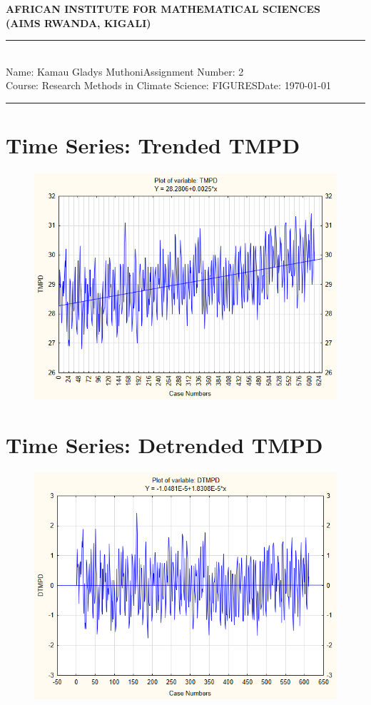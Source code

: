 \documentclass[12pt,a4paper]{article}
\newcommand{\student}{Kamau Gladys Muthoni}
\newcommand{\course}{Research Methods in Climate Science: FIGURES}
\newcommand{\assignment}{2}
\begin{document}
\thispagestyle{empty}
\begin{center}
\textbf{AFRICAN INSTITUTE FOR MATHEMATICAL SCIENCES \\[0.5cm]
(AIMS RWANDA, KIGALI)}
\vspace{1.0cm}
\end{center}

\noindent
\rule{17cm}{0.2cm}\\[0.3cm]
Name: \student \hfill Assignment Number: \assignment\\[0.1cm]
Course: \course \hfill Date: \today\\
\rule{17cm}{0.05cm}
\vspace{1.0cm}

\section{Time Series: Trended TMPD}


\begin{figure}[h]
	\centering
	\includegraphics[width=0.7\linewidth]{"Trended TMPD"}
	\caption{}
	\label{fig:trended-tmpd}
\end{figure}

\section{Time Series: Detrended TMPD}
\begin{figure}[h]
	\centering
	\includegraphics[width=0.7\linewidth]{"Detrended TMPD"}
	\caption{}
	\label{fig:detrended-tmpd}
\end{figure}
\newpage
\end{document}
